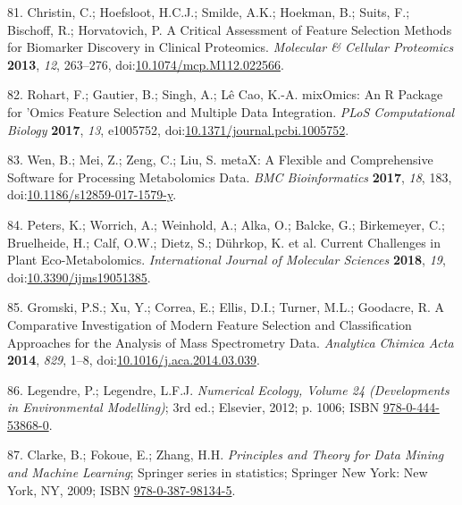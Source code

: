 \documentclass[]{article}
\begin{document}
\leavevmode\hypertarget{ref-christin_2013}{}%
81. Christin, C.; Hoefsloot, H.C.J.; Smilde, A.K.; Hoekman, B.; Suits, F.; Bischoff, R.; Horvatovich, P. A Critical Assessment of Feature Selection Methods for Biomarker Discovery in Clinical Proteomics. \emph{Molecular \& Cellular Proteomics} \textbf{2013}, \emph{12}, 263--276, doi:\href{https://doi.org/10.1074/mcp.M112.022566}{10.1074/mcp.M112.022566}.

\leavevmode\hypertarget{ref-rohart_2017}{}%
82. Rohart, F.; Gautier, B.; Singh, A.; Lê Cao, K.-A. mixOmics: An R Package for 'Omics Feature Selection and Multiple Data Integration. \emph{PLoS Computational Biology} \textbf{2017}, \emph{13}, e1005752, doi:\href{https://doi.org/10.1371/journal.pcbi.1005752}{10.1371/journal.pcbi.1005752}.

\leavevmode\hypertarget{ref-wen_2017}{}%
83. Wen, B.; Mei, Z.; Zeng, C.; Liu, S. metaX: A Flexible and Comprehensive Software for Processing Metabolomics Data. \emph{BMC Bioinformatics} \textbf{2017}, \emph{18}, 183, doi:\href{https://doi.org/10.1186/s12859-017-1579-y}{10.1186/s12859-017-1579-y}.

\leavevmode\hypertarget{ref-peters_2018}{}%
84. Peters, K.; Worrich, A.; Weinhold, A.; Alka, O.; Balcke, G.; Birkemeyer, C.; Bruelheide, H.; Calf, O.W.; Dietz, S.; Dührkop, K. et al. Current Challenges in Plant Eco-Metabolomics. \emph{International Journal of Molecular Sciences} \textbf{2018}, \emph{19}, doi:\href{https://doi.org/10.3390/ijms19051385}{10.3390/ijms19051385}.

\leavevmode\hypertarget{ref-gromski_2014}{}%
85. Gromski, P.S.; Xu, Y.; Correa, E.; Ellis, D.I.; Turner, M.L.; Goodacre, R. A Comparative Investigation of Modern Feature Selection and Classification Approaches for the Analysis of Mass Spectrometry Data. \emph{Analytica Chimica Acta} \textbf{2014}, \emph{829}, 1--8, doi:\href{https://doi.org/10.1016/j.aca.2014.03.039}{10.1016/j.aca.2014.03.039}.

\leavevmode\hypertarget{ref-legendre_2012}{}%
86. Legendre, P.; Legendre, L.F.J. \emph{Numerical Ecology, Volume 24 (Developments in Environmental Modelling)}; 3rd ed.; Elsevier, 2012; p. 1006; ISBN \href{https://worldcat.org/isbn/978-0-444-53868-0}{978-0-444-53868-0}.

\leavevmode\hypertarget{ref-clarke_2009}{}%
87. Clarke, B.; Fokoue, E.; Zhang, H.H. \emph{Principles and Theory for Data Mining and Machine Learning}; Springer series in statistics; Springer New York: New York, NY, 2009; ISBN \href{https://worldcat.org/isbn/978-0-387-98134-5}{978-0-387-98134-5}.
\end{document}
